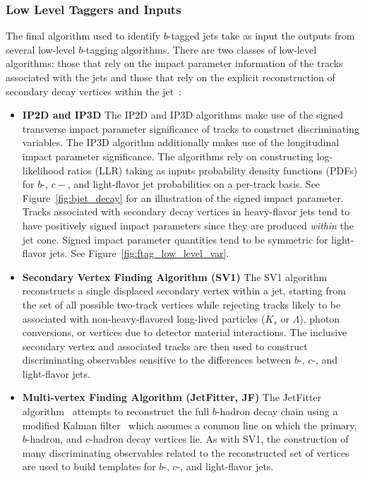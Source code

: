 \subsubsection{Low Level Taggers and Inputs}
\label{sec:ftag_low_level}

The final algorithm used to identify $b$-tagged jets take as input the outputs from several low-level
$b$-tagging algorithms.
There are two classes of low-level algorithms: those that rely on the impact parameter information of the
tracks associated with the jets and those that rely on the explicit reconstruction of secondary decay vertices
within the jet~\cite{FTAG2019}:

\begin{itemize}
    \item{\textbf{IP2D and IP3D}} The IP2D and IP3D algorithms make use of the signed transverse impact parameter significance of tracks
        to construct discriminating variables. The IP3D algorithm additionally makes use of the longitudinal impact parameter
        significance. The algorithms rely on constructing log-likelihood ratios (LLR) taking as inputs probability density functions (PDFs)
        for $b$-, $c-$, and light-flavor jet probabilities on a per-track basis.
        See Figure~\ref{fig:bjet_decay} for an illustration of the signed impact parameter.
        Tracks associated with secondary decay vertices in heavy-flavor jets tend to have positively signed impact parameters since they
        are produced \textit{within} the jet cone.
        Signed impact parameter quantities tend to be symmetric for light-flavor jets. See Figure~\ref{fig:ftag_low_level_var}.
    \item{\textbf{Secondary Vertex Finding Algorithm (SV1)}} The SV1 algorithm~\cite{SV1} reconstructs a single displaced secondary vertex within
        a jet, starting from the set of all possible two-track vertices while rejecting tracks likely to be associated with
        non-heavy-flavored long-lived particles ($K_s$ or $\Lambda$), photon conversions, or vertices due to detector material interactions.
        The inclusive secondary vertex and associated tracks are then used to construct discriminating observables sensitive to the differences
        between $b$-, $c$-, and light-flavor jets.
    \item{\textbf{Multi-vertex Finding Algorithm (JetFitter, JF)}} The JetFitter algorithm~\cite{JETFITTER} attempts to reconstruct the full
        $b$-hadron decay chain using a modified Kalman filter~\cite{KalmanFilter} which assumes a common line on which the primary, $b$-hadron,
        and $c$-hadron decay vertices lie. As with SV1, the construction of many discriminating observables related to the
        reconstructed set of vertices are used to build templates for $b$-, $c$-, and light-flavor jets.
\end{itemize}

